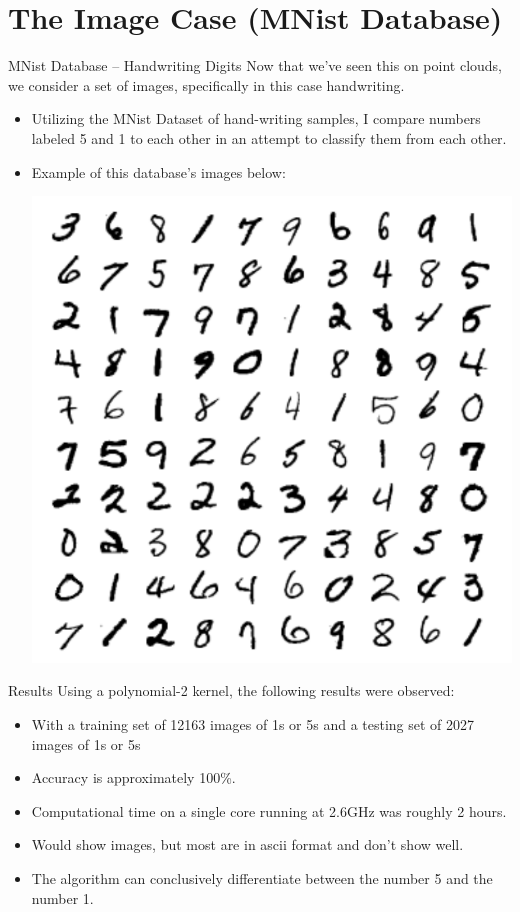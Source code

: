 \documentclass{beamer}
\begin{document}
\section{The Image Case (MNist Database)}

\begin{frame}{MNist Database -- Handwriting Digits}
Now that we've seen this on point clouds, we consider a set of images, specifically in this case handwriting.
\begin{itemize}
\item Utilizing the MNist Dataset\nocite{mnist} of hand-writing samples, I compare numbers labeled 5 and 1 to each other in an attempt to classify them from each other.
\item Example of this database's images below\nocite{lecun_bottou_bengio_haffner_1998}:
\begin{center}
\includegraphics[scale=.3]{lecun}
\end{center}
\end{itemize}
\end{frame}

\begin{frame}{Results}
Using a polynomial-2 kernel, the following results were observed:
\begin{itemize}
\item With a training set of 12163 images of 1s or 5s and a testing set of 2027 images of 1s or 5s
\item Accuracy is approximately 100\%.
\item Computational time on a single core running at 2.6GHz was roughly 2 hours.
\item Would show images, but most are in ascii format and don't show well.
\item The algorithm can conclusively differentiate between the number 5 and the number 1.
\end{itemize}
\end{frame}
\end{document}
